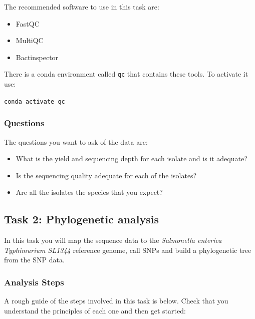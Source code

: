 \documentclass[11pt]{article}
\providecommand{\tightlist}{%
      \setlength{\itemsep}{0pt}\setlength{\parskip}{0pt}}
\begin{document}
The recommended software to use in this task are:

\begin{itemize}
\tightlist
\item
  FastQC
\item
  MultiQC
\item
  Bactinspector
\end{itemize}

There is a conda environment called \texttt{qc} that contains these
tools. To activate it use:

\texttt{conda\ activate\ qc}

\hypertarget{questions}{%
\subsubsection{Questions}\label{questions}}

The questions you want to ask of the data are:

\begin{itemize}
\tightlist
\item
  What is the yield and sequencing depth for each isolate and is it
  adequate?
\item
  Is the sequencing quality adequate for each of the isolates?
\item
  Are all the isolates the species that you expect?
\end{itemize}

    \hypertarget{task-2-phylogenetic-analysis}{%
\subsection{Task 2: Phylogenetic
analysis}\label{task-2-phylogenetic-analysis}}

In this task you will map the sequence data to the \textit{Salmonella
enterica Typhimurium SL1344} reference genome, call SNPs and build a
phylogenetic tree from the SNP data.

\hypertarget{analysis-steps}{%
\subsubsection{Analysis Steps}\label{analysis-steps}}

A rough guide of the steps involved in this task is below. Check that
you understand the principles of each one and then get started:
\end{document}
